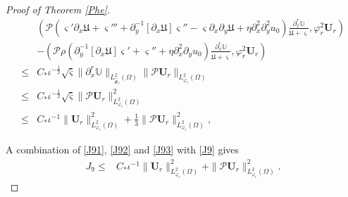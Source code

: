 \documentclass[10pt,a4paper]{amsart}
\begin{document}
\begin{proof}[Proof of Theorem \ref{Phe}]
\begin{align}
&\left(\mathcal{P}\left(\varsigma'\partial_{x}\mathfrak{U}+\varsigma'''+\partial_{y}^{-1}[\partial_{x}\mathfrak{U}]\varsigma''-\varsigma\partial_{x}\partial_{y}\mathfrak{U}+\eta\partial_{x}^{2}\partial_{y}^{2}u_{0}\right)\frac{\partial_{x}^{r}\mathbb{U}}{\dot{\mathfrak{U}}+\varsigma},\varphi_{r}^{2}\mathbf{U}_{r}\right)\\
&-\left(\mathcal{P}\rho\left(\partial_{y}^{-1}[\partial_{x}\mathfrak{U}]\varsigma'+\varsigma''+\eta\partial_{x}^{2}\partial_{y}u_{0}\right)\frac{\partial_{x}^{r}\mathbb{U}}{\dot{\mathfrak{U}}+\varsigma},\varphi_{r}^{2}\mathbf{U}_{r}\right)\nonumber\\
\leq& C_{*}\iota^{-\frac{1}{2}}\sqrt{\bar{\varsigma}}\|\partial_{x}^{r}\mathbb{U}\|_{L_{\hat{\Psi}_{r}}^{2}(\Omega)}
                               \|\mathcal{P}\mathbf{U}_{r}\|_{L_{\varphi_{r}}^{2}(\Omega)}\nonumber\\
\leq& C_{*}\iota^{-\frac{1}{2}}\sqrt{\bar{\varsigma}}\|\mathcal{P}\mathbf{U}_{r}\|_{L_{\varphi_{r}}^{2}(\Omega)}^{2}\nonumber\\
\leq& C_{*}\iota^{-1}\|\mathbf{U}_{r}\|_{L_{\varphi_{r}}^{2}(\Omega)}^{2}
     +\frac{1}{3}\|\mathcal{P}\mathbf{U}_{r}\|_{L_{\varphi_{r}}^{2}(\Omega)}^{2},\nonumber
\end{align}

A combination of \eqref{J91}, \eqref{J92} and \eqref{J93} with \eqref{J9} gives
\begin{align*}
J_{9}
\leq& C_{*}\iota^{-1}\|\mathbf{U}_{r}\|_{L_{\varphi_{r}}^{2}(\Omega)}^{2}
     +\|\mathcal{P}\mathbf{U}_{r}\|_{L_{\varphi_{r}}^{2}(\Omega)}^{2}.
\end{align*}


\end{proof}
\end{document}
